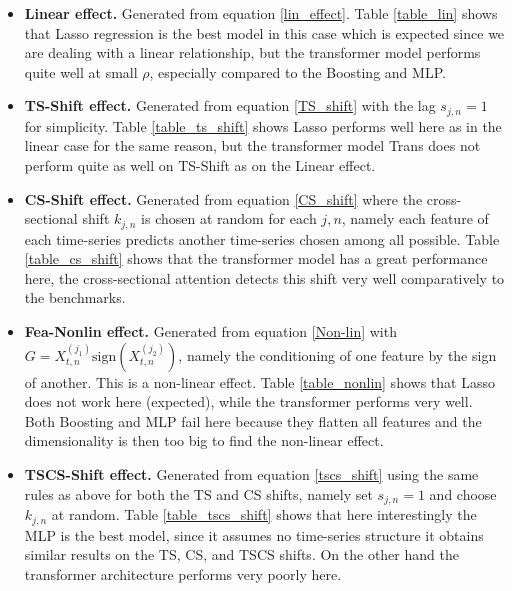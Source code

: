 \documentclass{article}
\begin{document}
\begin{itemize}
    \item \textbf{Linear effect.} Generated from equation \eqref{lin_effect}. Table \ref{table_lin} shows that Lasso regression is the best model in this case which is expected since we are dealing with a linear relationship, but the transformer model performs quite well at small $\rho$, especially compared to the Boosting and MLP.
    \item \textbf{TS-Shift effect.} Generated from equation \eqref{TS_shift} with the lag $s_{j,n}=1$ for simplicity. Table \ref{table_ts_shift} shows Lasso performs well here as in the linear case for the same reason, but the transformer model Trans does not perform quite as well on TS-Shift as on the Linear effect.
    \item \textbf{CS-Shift effect.} Generated from equation \eqref{CS_shift} where the cross-sectional shift $k_{j,n}$ is chosen at random for each $j,n$, namely each feature of each time-series predicts another time-series chosen among all possible. Table \ref{table_cs_shift} shows that the transformer model has a great performance here, the cross-sectional attention detects this shift very well comparatively to the benchmarks.
    \item \textbf{Fea-Nonlin effect.} Generated from equation \eqref{Non-lin} with $G=X_{t,n}^{(j_1)} \textrm{sign} (X_{t,n}^{(j_2)})$, namely the conditioning of one feature by the sign of another. This is a non-linear effect. Table \ref{table_nonlin} shows that Lasso does not work here (expected), while the transformer performs very well. Both Boosting and MLP fail here because they flatten all features and the dimensionality is then too big to find the non-linear effect.
    \item \textbf{TSCS-Shift effect.}  Generated from equation \eqref{tscs_shift} using the same rules as above for both the TS and CS shifts, namely set $s_{j,n}=1$ and choose $k_{j,n}$ at random. Table \ref{table_tscs_shift} shows that here interestingly the MLP is the best model, since it assumes no time-series structure it obtains similar results on the TS, CS, and TSCS shifts. On the other hand the transformer architecture performs very poorly here.
\end{itemize}
\end{document}
